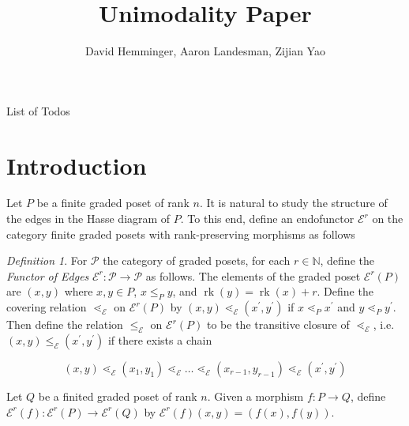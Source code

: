 \documentclass[10 pt]{amsart}
\title{Unimodality Paper}
\author{David Hemminger, Aaron Landesman, Zijian Yao}
\makeatletter
\theoremstyle{plain}
\theoremstyle{definition}
\theoremstyle{remark}
\numberwithin{equation}{section}
\theoremstyle{remark}
\newtheorem{defn}[thm]{Definition}
\newcommand\BN{{\mathbb N}}
\newcommand\rk{\operatorname{rk}}
\def\listtodoname{List of Todos}
\def\listoftodos{\@starttoc{tdo}\listtodoname}
\makeatother
\begin{document}
\listoftodos
\newpage

\maketitle


\section{Introduction}\label{sec:introduction}

Let $P$ be a finite graded poset of rank $n$.  It is natural to study the structure of the edges in the Hasse diagram of $P$.  To this end, define an endofunctor $\mathcal E^r$ on the category finite graded posets with rank-preserving morphisms as follows

\begin{defn}
\label{defn:functor_of_edges}
For $\mathcal P$ the category of graded posets, for each $r \in \BN$, define the {\it Functor of Edges} $\mathcal E^r:\mathcal P \rightarrow \mathcal P$ as follows. The elements of the graded poset $\mathcal E^r(P)$ are $(x, y)$ where $x,y\in P$, $x\le_P y$, and $\rk(y) = \rk(x) + r$. Define the covering relation $\lessdot_{\mathcal E}$ on $\mathcal E^r(P)$ by $(x, y) \lessdot_{\mathcal E} (x^\prime, y^\prime)$ if $x\lessdot_P x^\prime$ and $y\lessdot_P y^\prime$.  Then define the relation $\le_{\mathcal E}$ on $\mathcal E^r(P)$ to be the transitive closure of $\lessdot_{\mathcal E}$, i.e. $(x, y) \le_{\mathcal E} (x^\prime, y^\prime)$ if there exists a chain

$$(x, y)\lessdot_{\mathcal E} (x_1, y_1)\lessdot_{\mathcal E}\ldots\lessdot_{\mathcal E} (x_{r-1}, y_{r-1})\lessdot_{\mathcal E} (x^\prime, y^\prime)$$


Let $Q$ be a finited graded poset of rank $n$.  Given a morphism $f\colon P\rightarrow Q$, define $\mathcal E^r(f)\colon \mathcal E^r(P)\rightarrow \mathcal E^r(Q)$ by $\mathcal E^r(f)(x,y) = (f(x), f(y))$.
\end{defn}
\end{document}
